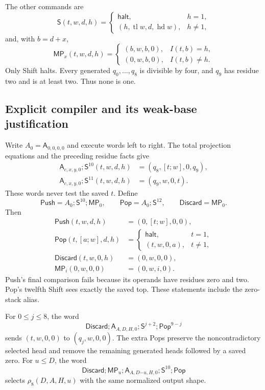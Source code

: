 The other commands are
\[
 \mathsf S(t,w,d,h)=
 \begin{cases}
  \mathsf{halt},&h=1,\\
  (h,\operatorname{tl}w,d,\operatorname{hd}w),&h\ne1,
 \end{cases}                                             \tag{G-S}
\]
and, with $b=d+x$,
\[
 \mathsf{MP}_x(t,w,d,h)=
 \begin{cases}
  (b,w,b,0),&I(t,b)=h,\\
  (0,w,b,0),&I(t,b)\ne h.
 \end{cases}                                             \tag{G-M}
\]
Only Shift halts.  Every generated $q_0,\ldots,q_8$ is divisible by
four, and $q_9$ has residue two and is at least two.  Thus none is one.

\subsection{Explicit compiler and its weak-base justification}

Write $A_0=\mathsf A_{0,0,0,0}$ and execute words left to right.
The total projection equations and the preceding residue facts give
\begin{align*}
 \mathsf A_{c,x,y,0};\mathsf S^{10}(t,w,d,h)
    &=(q_8,[t;w],0,q_9),\\
 \mathsf A_{c,x,y,0};\mathsf S^{11}(t,w,d,h)
    &=(q_9,w,0,t).
\end{align*}
These words never test the saved $t$.  Define
\[
 \mathsf{Push}=A_0;\mathsf S^{10};\mathsf{MP}_0,
 \qquad \mathsf{Pop}=A_0;\mathsf S^{12},
 \qquad \mathsf{Discard}=\mathsf{MP}_0.
\]
Then
\begin{align*}
 \mathsf{Push}(t,w,d,h)&=(0,[t;w],0,0),\\
 \mathsf{Pop}(t,[a;w],d,h)&=
   \begin{cases}\mathsf{halt},&t=1,\\(t,w,0,a),&t\ne1,\end{cases}\\
 \mathsf{Discard}(t,w,0,h)&=(0,w,0,0),\\
 \mathsf{MP}_i(0,w,0,0)&=(0,w,i,0).
\end{align*}
Push's final comparison fails because its operands have residues zero
and two.  Pop's twelfth Shift sees exactly the saved top.  These statements
include the zero-stack alias.

For $0\le j\le8$, the word
\[
 \mathsf{Discard};\mathsf A_{A,D,H,0};
                \mathsf S^{j+2};\mathsf{Pop}^{9-j}          \tag{G-Sel}
\]
sends $(t,w,0,0)$ to $(q_j,w,0,0)$.  The extra Pops preserve
the noncontradictory selected head and remove the remaining generated
heads followed by a saved zero.  For $u\le D$, the word
\[
 \mathsf{Discard};\mathsf{MP}_u;
 \mathsf A_{A,D\mathbin{\dot-}u,H,0};
                       \mathsf S^{10};\mathsf{Pop}          \tag{G-Rho}
\]
selects $\rho_8(D,A,H,u)$ with the same normalized output shape.

